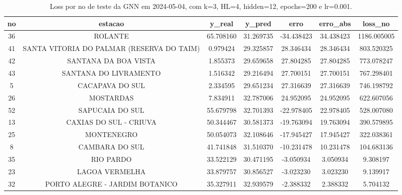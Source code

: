\begin{table}[h]
\centering
\caption{Loss por no de teste da GNN em 2024-05-04, com k=3, HL=4, hidden=12, epochs=200 e lr=0.001.}
\label{tab:gnn_loss_k3_hl4_h12_e200_d20240504}
\begin{tabular}{ccccccc}
\toprule
no & estacao & y\_real & y\_pred & erro & erro\_abs & loss\_no \\
\midrule
36 & ROLANTE & 65.708160 & 31.269735 & -34.438423 & 34.438423 & 1186.005005 \\
41 & SANTA VITORIA DO PALMAR (RESERVA DO TAIM) & 0.979424 & 29.325857 & 28.346434 & 28.346434 & 803.520325 \\
42 & SANTANA DA BOA VISTA & 1.855373 & 29.659658 & 27.804285 & 27.804285 & 773.078247 \\
43 & SANTANA DO LIVRAMENTO & 1.516342 & 29.216494 & 27.700151 & 27.700151 & 767.298401 \\
5 & CACAPAVA DO SUL & 2.334595 & 29.651234 & 27.316639 & 27.316639 & 746.198792 \\
26 & MOSTARDAS & 7.834911 & 32.787006 & 24.952095 & 24.952095 & 622.607056 \\
52 & SAPUCAIA DO SUL & 55.679798 & 32.701393 & -22.978405 & 22.978405 & 528.007080 \\
13 & CAXIAS DO SUL - CRIUVA & 50.344467 & 30.581373 & -19.763094 & 19.763094 & 390.579895 \\
25 & MONTENEGRO & 50.054073 & 32.108646 & -17.945427 & 17.945427 & 322.038361 \\
8 & CAMBARA DO SUL & 41.741848 & 31.510370 & -10.231478 & 10.231478 & 104.683136 \\
35 & RIO PARDO & 33.522129 & 30.471195 & -3.050934 & 3.050934 & 9.308197 \\
23 & LAGOA VERMELHA & 33.879757 & 30.856527 & -3.023230 & 3.023230 & 9.139917 \\
32 & PORTO ALEGRE - JARDIM BOTANICO & 35.327911 & 32.939579 & -2.388332 & 2.388332 & 5.704132 \\
\bottomrule
\end{tabular}
\end{table}
